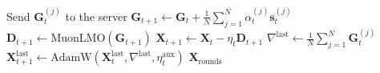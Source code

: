 \documentclass[letterpaper]{article} %
\begin{document}
\begin{algorithm}[!t]
\begin{algorithmic}[1]
            \State Send $\mathbf{G}_t^{(j)}$ to the server
        \EndFor
    \EndFor
    \State $\mathbf{G}_{t+1} \gets \mathbf{G}_t + \frac{1}{N} \sum_{j=1}^N \alpha_t^{(j)} \mathbf{s}_t^{(j)}$ 
        \State $\mathbf{D}_{t+1} \gets \mathrm{MuonLMO}(\mathbf{G}_{t+1})$ 
        \State $\mathbf{X}_{t+1} \gets \mathbf{X}_t - \eta_t \mathbf{D}_{t+1}$ 
    \EndFor
    \State $\nabla^{\text{last}} \gets \frac{1}{N} \sum_{j=1}^N \mathbf{G}_t^{(j)}$
    \State $\mathbf{X}_{t+1}^{\text{last}} \gets \text{AdamW}(\mathbf{X}_t^{\text{last}}, \nabla^{\text{last}}, \eta_t^{\text{aux}})$ 
\EndFor
\State \Return $\mathbf{X}_{\mathrm{rounds}}$
\end{algorithmic}
\end{algorithm}



\end{document}
